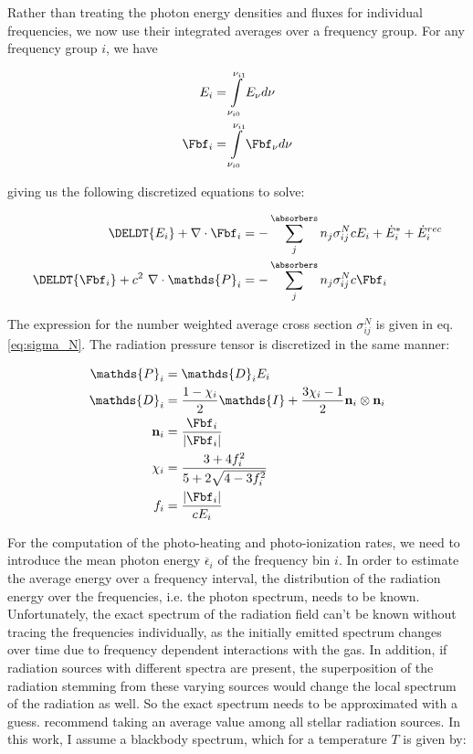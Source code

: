 Rather than treating the photon energy densities and fluxes for individual frequencies, we now use
their integrated averages over a frequency group. For any frequency group $i$, we have

\begin{align}
	E_i &=
        \int\limits_{\nu_{i0}}^{\nu_{i1}} E_\nu d\nu \\
	\Fbf_i &=
       \int\limits_{\nu_{i0}}^{\nu_{i1}} \Fbf_\nu d\nu
\end{align}


giving us the following discretized equations to solve:


\begin{align}
	\DELDT{E_i} + \nabla \cdot \Fbf_i &=
		- \sum\limits_{j}^{\absorbers} n_j \sigma_{i j}^N c E_i + \dot{E}_i^* + \dot{E}_i ^{rec}
		\label{eq:dEdt-group} \\
	\DELDT{\Fbf_i} + c^2 \ \nabla \cdot \mathds{P}_i &=
		- \sum\limits_{j}^{\absorbers} n_j \sigma_{i j}^N c \Fbf_i
		\label{eq:dFdt-group}
\end{align}


The expression for the number weighted average cross section $\sigma_{ij}^N$ is given in eq.
\ref{eq:sigma_N}. The radiation pressure tensor is discretized in the same manner:

\begin{align}
	\mathds{P}_i &=
        \mathds{D}_i E_i \label{eq:pressure-tensor-group-start}\\
	\mathds{D}_i &=
        \frac{1- \chi_i}{2} \mathds{I} + \frac{3 \chi_i - 1}{2} \mathbf{n}_i \otimes \mathbf{n}_i
        \label{eq:eddington-group} \\
	\mathbf{n}_i &=
        \frac{\Fbf_i}{|\Fbf_i|} \\
	\chi_i &=
        \frac{3 + 4 f_i ^2}{5 + 2 \sqrt{4 - 3 f_i^2}} \\
	f_i &=
        \frac{|\Fbf_i|}{c E_i} \label{eq:pressure-tensor-group-end}
\end{align}



For the computation of the  photo-heating and photo-ionization rates, we need to introduce the mean
photon energy $\overline{\epsilon}_i$ of the frequency bin $i$. In order to estimate the average
energy over a frequency interval, the distribution of the radiation energy over the frequencies,
i.e. the photon spectrum, needs to be known. Unfortunately, the exact spectrum of the radiation
field can't be known without tracing the frequencies individually, as the initially emitted spectrum
changes over time due to frequency dependent interactions with the gas. In addition, if radiation
sources with different spectra are present, the superposition of the radiation stemming from these
varying sources would change the local spectrum of the radiation as well. So the exact spectrum
needs to be approximated with a guess. \cite{ramses-rt13} recommend taking an average value among
all stellar radiation sources. In this work, I assume a blackbody spectrum, which for a temperature
$T$ is given by:

